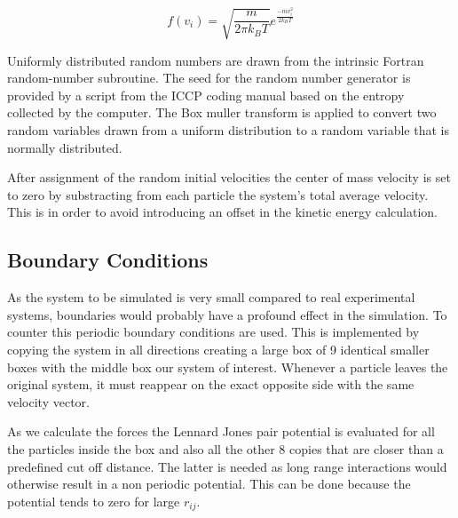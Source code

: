 \documentclass[
10pt, %
a4paper, %
oneside, %
headinclude,footinclude, %
BCOR5mm, %
]{scrartcl}
\newcommand{\insertcode}[2]{\begin{itemize}\item[]\end{itemize}} %
\begin{document}
\begin{equation} f(v_i) = \sqrt{\frac{m}{2\pi k_B T}} e^{\frac{-mv_i^2}{2k_BT}} 
\label{eq:boltzgauss}
\end{equation}



Uniformly distributed random numbers are drawn from the intrinsic Fortran random-number subroutine. The seed for the random number generator is provided by a script from the ICCP coding manual\cite{Glosser:2015iccp} based on the entropy collected by the computer. The Box muller transform is applied to convert two random variables drawn from a uniform distribution to a random variable that is normally distributed.

After assignment of the random initial velocities the center of mass velocity is set to zero by substracting from each particle the system's total average velocity. This is in order to avoid introducing an offset in the kinetic energy calculation.

\subsection{Boundary Conditions}
As the system to be simulated is very small compared to real experimental systems, boundaries would probably have a profound effect in the simulation. 
To counter this periodic boundary conditions are used. This is implemented by copying the system in all directions creating a large box of 9 identical smaller boxes with the middle box our system of interest. Whenever a particle leaves the original system, it must reappear on the exact opposite side with the same velocity vector.

As we calculate the forces the Lennard Jones pair potential is evaluated for all the particles inside the box and also all the other 8 copies that are closer than a predefined cut off distance. 
The latter is needed as long range interactions would otherwise result in a non periodic potential. This can be done because the potential tends to zero for large $r_{ij}$.


\end{document}
